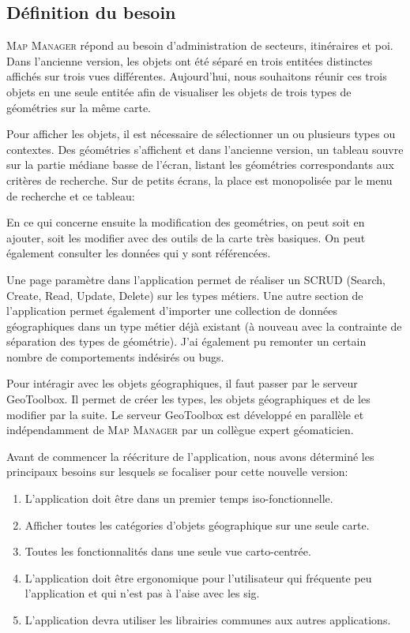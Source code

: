 \documentclass{rapportUHA40}
\begin{document}

\subsection{Définition du besoin}
\textsc{Map Manager} répond au besoin d'administration de secteurs,
itinéraires et poi. Dans l'ancienne version, les objets ont été séparé en trois
entitées distinctes affichés sur trois vues différentes. Aujourd'hui, nous
souhaitons réunir ces trois objets en une seule entitée afin de visualiser les
objets de trois types de géométries sur la même carte.

Pour afficher les objets, il est nécessaire de sélectionner un ou plusieurs
types ou contextes. Des géométries s'affichent et dans l'ancienne version, un
tableau souvre sur la partie médiane basse de l'écran, listant les géométries
correspondants aux critères de recherche. Sur de petits écrans, la place est
monopolisée par le menu de recherche et ce tableau:

En ce qui concerne ensuite la modification des geométries, on peut soit en
ajouter, soit les modifier avec des outils de la carte très basiques. On peut
également consulter les données qui y sont référencées.

Une page paramètre dans l'application permet de réaliser un SCRUD (Search,
Create, Read, Update, Delete) sur les types métiers. Une autre section de
l'application permet également d'importer une collection de données
géographiques dans un type métier déjà existant (à nouveau avec la contrainte
de séparation des types de géométrie). J'ai également pu remonter un certain
nombre de comportements indésirés ou bugs.

Pour intéragir avec les objets géographiques, il faut passer par le serveur
GeoToolbox. Il permet de créer les types, les objets géographiques et de les
modifier par la suite. Le serveur GeoToolbox est développé en parallèle et
indépendamment de \textsc{Map Manager} par un collègue expert géomaticien.

Avant de commencer la réécriture de l'application, nous avons déterminé les
principaux besoins sur lesquels se focaliser pour cette nouvelle version:
\begin{enumerate}
  \item L'application doit être dans un premier temps iso-fonctionnelle.
  \item Afficher toutes les catégories d'objets géographique sur une seule carte.
  \item Toutes les fonctionnalités dans une seule vue carto-centrée.
  \item L'application doit être ergonomique pour l'utilisateur qui fréquente peu
        l'application et qui n'est pas à l'aise avec les \gls{sig}.
  \item L'application devra utiliser les librairies communes aux autres applications.
\end{enumerate}
\end{document}
